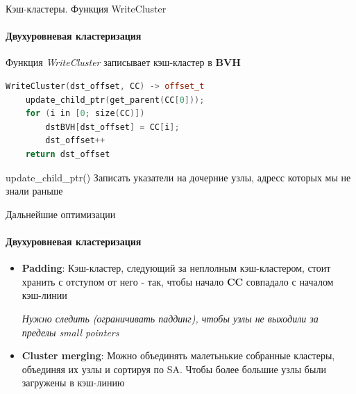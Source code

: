 \begin{frame}[fragile]{Кэш-кластеры. Функция WriteCluster}
    \framesubtitle{Двухуровневая кластеризация}
    \begin{block}{}
        Функция \textit{WriteCluster} записывает кэш-кластер в \textbf{BVH}
    \end{block}
    \begin{lstlisting}[language=C++,basicstyle=\ttfamily,keywordstyle=\color{blue}]
WriteCluster(dst_offset, CC) -> offset_t
    update_child_ptr(get_parent(CC[0]));
    for (i in [0; size(CC)])
        dstBVH[dst_offset] = CC[i];
        dst_offset++
    return dst_offset
    \end{lstlisting}
    \begin{block}{update\_child\_ptr()}
        Записать указатели на дочерние узлы, адресс которых мы не знали раньше
    \end{block}
\end{frame}

\begin{frame}[t]{Дальнейшие оптимизации}
    \framesubtitle{Двухуровневая кластеризация}
    \begin{itemize}
        \item
            \textbf{Padding}:
            Кэш-кластер, следующий за неплолным кэш-кластером, стоит хранить с отступом от него -
            так, чтобы начало \textbf{CC} совпадало с началом кэш-линии

            \textit{Нужно следить (ограничивать паддинг), чтобы узлы не выходили за пределы \textit{small pointers}}
        \item
            \textbf{Cluster merging}:
            Можно объединять малетьнькие собранные кластеры, объединяя их узлы и сортируя по SA.
            Чтобы более большие узлы были загружены в кэш-линию
    \end{itemize}
\end{frame}

